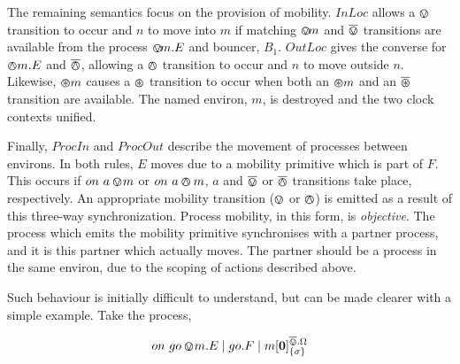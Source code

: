 \documentclass[orivec,envcountsame]{llncs}
\begin{document}
The remaining semantics focus on the provision of mobility.  $InLoc$
allows a $\varovee$ transition to occur and $n$ to move into $m$ if matching
$\varovee\!m$ and $\overline{\varovee}$ transitions are available from the process
$\varovee\!m.E$ and bouncer, $B_1$.  $OutLoc$ gives the converse for
$\varowedge m.E$ and $\overline{\varowedge}$, allowing a $\varowedge$ transition to occur and
$n$ to move outside $n$.  Likewise, $\varoast m$ causes a $\varoast$
transition to occur when both an $\varoast m$ and an $\overline{\varoast}$
transition are available.  The named environ, $m$, is destroyed and the
two clock contexts unified.



Finally, $ProcIn$ and $ProcOut$ describe the movement of processes
between environs.  In both rules, $E$ moves due to a mobility primitive
which is part of $F$.  This occurs if $on\ a \varovee\!m$ or
$on\ a \varowedge m$, $a$ and $\overline{\varovee}$ or $\overline{\varowedge}$ transitions take place,
respectively.  An appropriate mobility transition ($\varovee$ or $\varowedge$) is
emitted as a result of this three-way synchronization.  Process
mobility, in this form, is \emph{objective}.  The process which emits
the mobility primitive synchronises with a partner process, and it is
this partner which actually moves.  The partner should be a process in
the same environ, due to the scoping of actions described above.


Such behaviour is initially difficult to understand, but can be made
clearer with a simple example.  Take the process,

\begin{equation}
on\ go \varovee\!m.E \mid go.F \mid {m}[ \textbf{0} ]^{\overline{\varovee}.\Omega}_{\{\sigma\}}
\end{equation}
\end{document}
